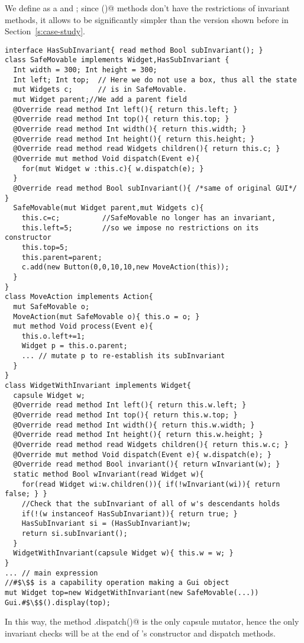 We define \Q@SafeMovable@ as a \Q@Widget@ and \Q@HasSubInvariant@; since \Q@subInvariant()@ methods don't have the restrictions of invariant methods, it allows \Q@SafeMovable@ to be significantly simpler than the version shown before in Section~\ref{s:case-study}.
\begin{lstlisting}
interface HasSubInvariant{ read method Bool subInvariant(); }
class SafeMovable implements Widget,HasSubInvariant {
  Int width = 300; Int height = 300;
  Int left; Int top;  // Here we do not use a box, thus all the state
  mut Widgets c;      // is in SafeMovable.
  mut Widget parent;//We add a parent field
  @Override read method Int left(){ return this.left; }
  @Override read method Int top(){ return this.top; }
  @Override read method Int width(){ return this.width; }
  @Override read method Int height(){ return this.height; }
  @Override read method read Widgets children(){ return this.c; }
  @Override mut method Void dispatch(Event e){
    for(mut Widget w :this.c){ w.dispatch(e); }
  }
  @Override read method Bool subInvariant(){ /*same of original GUI*/ }
  SafeMovable(mut Widget parent,mut Widgets c){
    this.c=c;          //SafeMovable no longer has an invariant,
    this.left=5;       //so we impose no restrictions on its constructor
    this.top=5;
    this.parent=parent;
    c.add(new Button(0,0,10,10,new MoveAction(this));
  }
}
class MoveAction implements Action{
  mut SafeMovable o;
  MoveAction(mut SafeMovable o){ this.o = o; }
  mut method Void process(Event e){
    this.o.left+=1;
    Widget p = this.o.parent;
    ... // mutate p to re-establish its subInvariant
  }
}
class WidgetWithInvariant implements Widget{
  capsule Widget w;
  @Override read method Int left(){ return this.w.left; }
  @Override read method Int top(){ return this.w.top; }
  @Override read method Int width(){ return this.w.width; }
  @Override read method Int height(){ return this.w.height; }
  @Override read method read Widgets children(){ return this.w.c; }
  @Override mut method Void dispatch(Event e){ w.dispatch(e); }
  @Override read method Bool invariant(){ return wInvariant(w); }
  static method Bool wInvariant(read Widget w){
    for(read Widget wi:w.children()){ if(!wInvariant(wi)){ return false; } }
    //Check that the subInvariant of all of w's descendants holds
    if(!(w instanceof HasSubInvariant)){ return true; }
    HasSubInvariant si = (HasSubInvariant)w;
    return si.subInvariant();
  }
  WidgetWithInvariant(capsule Widget w){ this.w = w; }
}
... // main expression
//#$\$$ is a capability operation making a Gui object
mut Widget top=new WidgetWithInvariant(new SafeMovable(...))
Gui.#$\$$().display(top);
\end{lstlisting}
In this way, the method \Q@WidgetWithInvariant.dispatch()@ is the only capsule mutator, hence the only invariant checks will be at the end of \Q@WidgetWithInvariant@'s constructor and dispatch methods.

